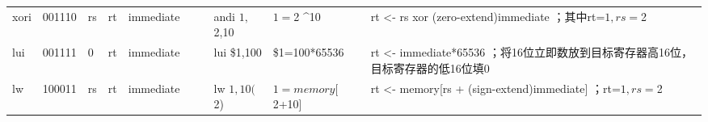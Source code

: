 \documentclass[12pt,a4paper]{article}
\begin{document}
\begin{landscape}
\begin{table}[]
{\begin{tabular}{llllllllll}
xori   & 001110 & rs     & rt     & immediate &       &        & andi $1,$2,10   & $1=$2 \textasciicircum 10            & rt \textless{}- rs xor   (zero-extend)immediate ；其中rt=$1,rs=$2                                                                                                                                                                          \\
lui    & 001111 & 0      & rt     & immediate &       &        & lui \$1,100     & \$1=100*65536                        & rt \textless{}-   immediate*65536 ；将16位立即数放到目标寄存器高16位，目标寄存器的低16位填0                                                                                                                                                                      \\
lw     & 100011 & rs     & rt     & immediate &       &        & lw $1,10($2)    & $1=memory[$2+10{]}                   & rt \textless{}- memory{[}rs +   (sign-extend)immediate{]} ；rt=$1,rs=$2\\                                                                                                                                                                 


\end{tabular}}
\end{table}
\end{landscape}
\end{document}
